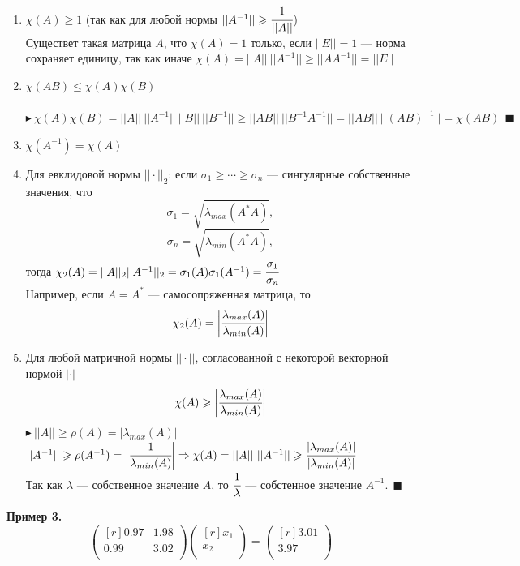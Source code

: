 \documentclass[12pt]{article}
\theoremstyle{definition}
\numberwithin{equation}{section}
\begin{document}
	\begin{enumerate}
		\item $\chi(A) \geqslant 1$ (так как для любой нормы $||A^{-1}||\geqslant \cfrac{1}{||A||}$)\\
		Существет такая матрица $A$, что $\chi(A)=1$ только, если $||E||=1$ --- норма сохраняет единицу, так как иначе $\chi(A)=||A||~||A^{-1}||\geqslant ||AA^{-1}||=||E||$
		\item $\chi(AB)\leqslant \chi(A) \chi(B)$\\~\\
		$\blacktriangleright~\chi(A) \chi(B)=||A||~||A^{-1}||~||B||~||B^{-1}|| \geqslant ||AB||~||B^{-1}A^{-1}||=||AB||~||(AB)^{-1}||=\chi(AB)~~\blacksquare$
		\item $\chi(A^{-1})=\chi(A)$
		\item Для евклидовой нормы $||\cdot||_2$: если $\sigma_1\geqslant \cdots \geqslant \sigma_n$ --- сингулярные собственные значения, что $$\sigma_1=\sqrt{\lambda_{max}(A^*A)},$$
		$$\sigma_n=\sqrt{\lambda_{min}(A^*A)},$$
		тогда $\chi_2(A)=||A||_2||A^{-1}||_2=\sigma_1(A)\sigma_1(A^{-1})=\cfrac{\sigma_1}{\sigma_n}$\\
		Например, если $A=A^*$ --- самосопряженная матрица, то $$\chi_2(A)= \bigg | \cfrac{ \lambda_{max}(A)}{ \lambda_{min}(A)} \bigg |$$
		\item Для любой матричной нормы $||\cdot||$, согласованной с некоторой векторной нормой $|\cdot|$ $$\chi(A)\geqslant \bigg | \cfrac{ \lambda_{max}(A)}{ \lambda_{min}(A)} \bigg |$$
		$\blacktriangleright~||A||\geqslant \rho(A)=|\lambda_{max}(A)|$\\
		$||A^{-1}||\geqslant \rho(A^{-1})=\bigg | \cfrac{1}{\lambda_{min}(A)} \bigg | \Rightarrow \chi(A)=||A||~||A^{-1}||\geqslant \cfrac{|\lambda_{max}(A)|}{|\lambda_{min}(A)|}$\\
		Так как $\lambda$ --- собственное значение $A$, то $\cfrac{1}{\lambda}$ --- собстенное значение $A^{-1}.~~\blacksquare$
	\end{enumerate}
	\textbf{Пример 3.}\\
	\[\begin{pmatrix}[r]
	0.97 & 1.98 \\
	0.99 & 3.02 \\
	\end{pmatrix} \begin{pmatrix}[r]
	x_1 \\
	x_2 \\
	\end{pmatrix} = \begin{pmatrix}[r]
	3.01 \\
	3.97 \\
	\end{pmatrix}\]
\end{document}
